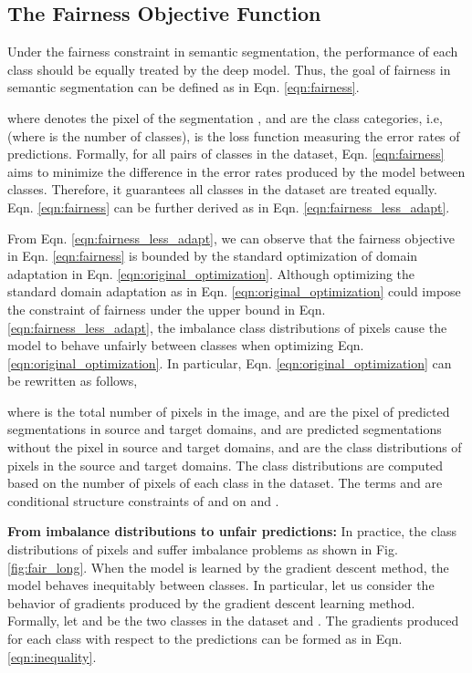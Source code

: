\documentclass[10pt,twocolumn,letterpaper]{article}
\begin{document}
\subsection{The Fairness Objective Function}

Under the fairness constraint in semantic segmentation, the performance of each class should be equally treated by the deep model. Thus, the goal of fairness in semantic segmentation can be defined as in Eqn. \eqref{eqn:fairness}.

where  denotes the  pixel of the segmentation , 
 and  are the class categories, i.e,  (where  is the number of classes),
 is the loss function measuring the error rates of predictions. 
Formally, for all pairs of classes in the dataset,  Eqn. \eqref{eqn:fairness} aims to minimize the difference in the error rates produced by the model between classes. Therefore, it guarantees all classes in the dataset are treated equally. Eqn. \eqref{eqn:fairness} can be further derived as in Eqn. \eqref{eqn:fairness_less_adapt}.

From Eqn. \eqref{eqn:fairness_less_adapt}, we can observe that the fairness objective in Eqn. \eqref{eqn:fairness} is bounded by the standard optimization of domain adaptation in Eqn. \eqref{eqn:original_optimization}.
Although optimizing the standard domain adaptation as in Eqn.  \eqref{eqn:original_optimization} could impose the constraint of fairness under the upper bound in Eqn. \eqref{eqn:fairness_less_adapt}, the imbalance class distributions of pixels cause the model to behave unfairly between classes when optimizing Eqn. \eqref{eqn:original_optimization}. In particular,
Eqn. \eqref{eqn:original_optimization} can be rewritten as follows,

where  is the total number of pixels in the image, 
 and   are the  pixel of predicted segmentations in source and target domains,
 and  are predicted segmentations without the  pixel in source and target domains,  and  are the class distributions of pixels in the source and target domains.
The class distributions are computed based on the number of pixels of each class in the dataset.
The terms  and  are conditional structure constraints of  and  on  and .

\noindent
\textbf{From imbalance distributions to unfair predictions:}
In practice, the class distributions of pixels  and  suffer imbalance problems as shown in Fig. \ref{fig:fair_long}.
When the model is learned by the gradient descent method, the model behaves inequitably between classes. In particular, let us consider the behavior of gradients produced by the gradient descent learning method. Formally, let  and  be the two classes in the dataset and . The gradients produced for each class with respect to the predictions can be formed as in Eqn. \eqref{eqn:inequality}.
\end{document}
